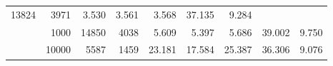 \begin{table}
\begin{tabular}{rrrrrrrrr}
							     13824  & 3971  
	                           & 3.530 & 3.561 & 3.568
	                           & 37.135 & 9.284  \\
	                
	            
					 &  
					 
					\multirow{ 1 }{*}{ 1000 } &
					
						
							    
							     14850  & 4038  
	                           & 5.609 & 5.397 & 5.686
	                           & 39.002 & 9.750  \\
	                
	            
					 &  
					 
					\multirow{ 1 }{*}{ 10000 } &
					
						
							    
							     5587  & 1459  
	                           & 23.181 & 17.584 & 25.387
	                           & 36.306 & 9.076  \\
	                
	            
	        

\hline

\end{tabular}
\end{table}
\clearpage


	    


